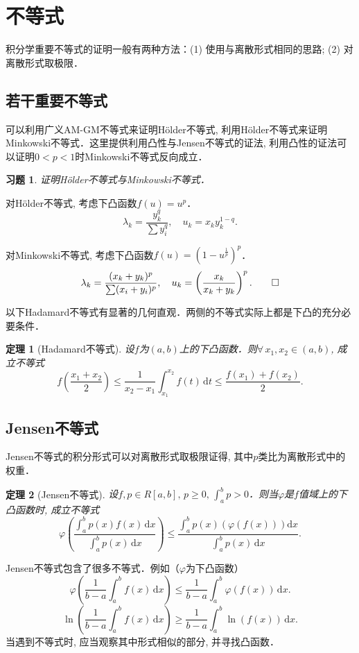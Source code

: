 \documentclass[11pt,a4paper]{ctexart}
\makeatletter
\theoremstyle{thmseries} %
\newtheorem{thm}{定理}[section]
\theoremstyle{exerseries}
\newtheorem{exer}{习题}[section]
\renewenvironment{proof}[1][\proofname]{\par
  \pushQED{\qed}%
  \normalfont \topsep6\p@\@plus6\p@\relax
  \trivlist
  \item[\hskip\labelsep
        \itshape
    #1\@addpunct{}]\ignorespaces
}{%
  \popQED\endtrivlist\@endpefalse
}
\newenvironment{pf}{\begin{proof}[\bfseries\upshape 证\quad]}{\end{proof}}
\newcommand{\bra}[1]{\mathopen{}\left(#1\right)}
\renewcommand{\phi}{\varphi}
\renewcommand{\d}{\mathrm{d}}
\makeatother
\begin{document}
\section{不等式}
积分学重要不等式的证明一般有两种方法：(1) 使用与离散形式相同的思路; (2) 对离散形式取极限．
\subsection{若干重要不等式}
可以利用广义AM-GM不等式来证明H\"older不等式, 利用H\"older不等式来证明Minkowski不等式．这里提供利用凸性与Jensen不等式的证法, 利用凸性的证法可以证明$0<p<1$时Minkowski不等式反向成立．
\begin{exer}
	证明H\"older不等式与Minkowski不等式．
\end{exer}
\begin{pf}
	对H\"older不等式, 考虑下凸函数$f(u)=u^p$．
	\[\lambda_k=\frac{y_k^q}{\sum y_i^q},\quad u_k=x_ky_k^{1-q}.\]

	对Minkowski不等式, 考虑下凸函数$f(u)=\bra{1-u^{\frac{1}{p}}}^p$．
	\[\lambda_k=\frac{(x_k+y_k)^p}{\sum(x_i+y_i)^p},\quad u_k=\bra{\frac{x_k}{x_k+y_k}}^p.\qedhere\]
\end{pf}

以下Hadamard不等式有显著的几何直观．两侧的不等式实际上都是下凸的充分必要条件．
\begin{thm}[Hadamard不等式]
	设$f$为$(a,b)$上的下凸函数．则$\forall\,x_1,x_2\in(a,b)$, 成立不等式
	\[f\bra{\frac{x_1+x_2}{2}}\leq\frac{1}{x_2-x_1}\int_{x_1}^{x_2}f(t)\,\d t\leq\frac{f(x_1)+f(x_2)}{2}.\]
\end{thm}


\subsection{Jensen不等式}
Jensen不等式的积分形式可以对离散形式取极限证得, 其中$p$类比为离散形式中的权重．
\begin{thm}[Jensen不等式]
	设$f,p\in R[a,b],\,p\geq0,\,\int_{a}^{b}p>0$．则当$\phi$是$f$值域上的下凸函数时, 成立不等式
	\[\phi\bra{\frac{\int_{a}^{b}p(x)f(x)\,\d x}{\int_{a}^{b}p(x)\,\d x}}\leq\frac{\int_{a}^{b}p(x)\bra{\phi(f(x))}\d x}{\int_{a}^{b}p(x)\,\d x}.\]
\end{thm}

Jensen不等式包含了很多不等式．例如（$\phi$为下凸函数）
\[\phi\bra{\frac{1}{b-a}\int_{a}^{b}f(x)\,\d x}\leq\frac{1}{b-a}\int_{a}^{b}\phi(f(x))\,\d x.\]
\[\ln\bra{\frac{1}{b-a}\int_{a}^{b}f(x)\,\d x}\geq\frac{1}{b-a}\int_{a}^{b}\ln(f(x))\,\d x.\]
当遇到不等式时, 应当观察其中形式相似的部分, 并寻找凸函数．
\end{document}
